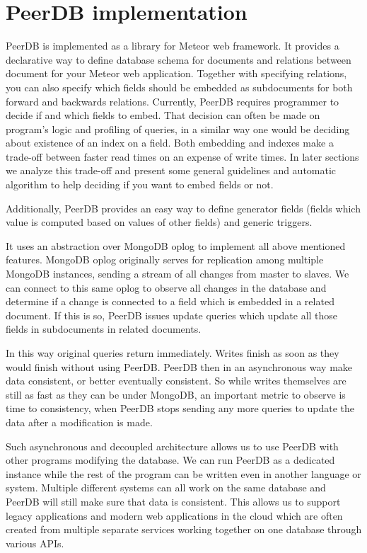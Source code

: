 \section{PeerDB implementation}

PeerDB is implemented as a library for Meteor web framework.
It provides a declarative way to define database schema for documents and relations between document for your Meteor web application.
Together with specifying relations, you can also specify which fields should be embedded as subdocuments for both forward and backwards relations.
Currently, PeerDB requires programmer to decide if and which fields to embed.
That decision can often be made on program's logic and profiling of queries, in a similar way one would be deciding about existence of an index on a field.
Both embedding and indexes make a trade-off between faster read times on an expense of write times.
In later sections we analyze this trade-off and present some general guidelines and automatic algorithm to help deciding if you want to embed fields or not.

Additionally, PeerDB provides an easy way to define generator fields (fields which value is computed based on values of other fields) and generic triggers.

It uses an abstraction over MongoDB oplog to implement all above mentioned features.
MongoDB oplog originally serves for replication among multiple MongoDB instances, sending a stream of all changes from master to slaves.
We can connect to this same oplog to observe all changes in the database and determine if a change is connected to a field which is embedded in a related document.
If this is so, PeerDB issues update queries which update all those fields in subdocuments in related documents.

In this way original queries return immediately.
Writes finish as soon as they would finish without using PeerDB.
PeerDB then in an asynchronous way make data consistent, or better eventually consistent.
So while writes themselves are still as fast as they can be under MongoDB, an important metric to observe is time to consistency, when PeerDB stops sending any more queries to update the data after a modification is made.

Such asynchronous and decoupled architecture allows us to use PeerDB with other programs modifying the database.
We can run PeerDB as a dedicated instance while the rest of the program can be written even in another language or system.
Multiple different systems can all work on the same database and PeerDB will still make sure that data is consistent.
This allows us to support legacy applications and modern web applications in the cloud which are often created from multiple separate services working together on one database through various APIs.

